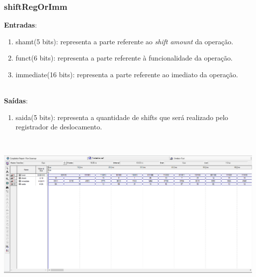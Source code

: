 \documentclass{article}
\begin{document}
    \subsubsection{shiftRegOrImm}
    \textbf{Entradas}:
    \begin{enumerate}
        \item shamt(5 bits): representa a parte referente ao {\it shift amount} da operação.
        \item funct(6 bits): representa a parte referente à funcionalidade da operação.
        \item immediate(16 bits): representa a parte referente ao imediato da operação.\\
    \end{enumerate}
    \\
    \textbf{Saídas}:
    \begin{enumerate}
        \item saida(5 bits): representa a quantidade de shifts que será realizado pelo registrador de deslocamento.\\
    \end{enumerate}\\
    \begin{center}
        \includegraphics[scale=0.4]{shiftRegOrImm.PNG}
    \end{center}
    
    \newpage
\end{document}
